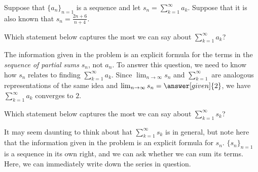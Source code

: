 \documentclass{ximera}
\begin{document}
\begin{example}
Suppose that $\{a_n\}_{n=1}$ is a sequence and let $s_n = \sum_{k=1}^{\infty} a_k$.  Suppose that it is also known that $s_n = \frac{2n+6}{n+4}$.

\begin{question}
Which statement below captures the most we can say about $\sum_{k=1}^{\infty} a_k$? 

\begin{multipleChoice}
\end{multipleChoice}

\begin{feedback}
The information given in the problem is an explicit formula for the terms in the \emph{sequence of partial sums} $s_n$, not $a_n$.  To answer this question, we need to know how $s_n$ relates to finding $\sum_{k=1}^{\infty} a_k$.  Since $\lim_{n \to \infty} s_n$ and $\sum_{k=1}^{\infty}$ are analogous representations of the same idea and $\lim_{n \to \infty} s_n = \answer[given]{2}$, we have $\sum_{k=1}^{\infty} a_k$ converges to $2$. 
\end{feedback}
\end{question}
\begin{question}
Which statement below captures the most we can say about $\sum_{k=1}^{\infty} s_k$? 

\begin{multipleChoice}
\end{multipleChoice}

\begin{feedback}
It may seem daunting to think about hat $\sum_{k=1}^{\infty} s_k$ is in general, but note here that the information given in the problem is an explicit formula for $s_n$.  $\{s_n\}_{n=1}$ is a sequence in its own right, and we can ask whether we can sum its terms.  Here, we can immediately write down the series in question.


\end{feedback}
\end{question}
\end{example}
\end{document}
